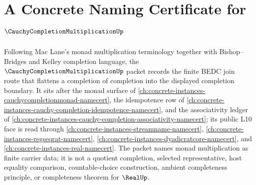 \chapter{A Concrete Naming Certificate for $\CauchyCompletionMultiplicationUp$}
\label{ch:concrete-instances-cauchycompletionmultiplication-namecert}

Following Mac Lane's monad multiplication terminology together with Bishop--Bridges and Kelley completion language, the $\CauchyCompletionMultiplicationUp$ packet records the finite BEDC join route that flattens a completion of completion into the displayed completion boundary. It sits after the monad surface of \autoref{ch:concrete-instances-cauchycompletionmonad-namecert}, the idempotence row of \autoref{ch:concrete-instances-cauchy-completion-idempotence-namecert}, and the associativity ledger of \autoref{ch:concrete-instances-cauchy-completion-associativity-namecert}; its public L10 face is read through \autoref{ch:concrete-instances-streamname-namecert}, \autoref{ch:concrete-instances-regseqrat-namecert}, \autoref{ch:concrete-instances-dyadicratcore-namecert}, and \autoref{ch:concrete-instances-real-namecert}. The packet names monad multiplication as finite carrier data; it is not a quotient completion, selected representative, host equality comparison, countable-choice construction, ambient completeness principle, or completeness theorem for $\RealUp$.

